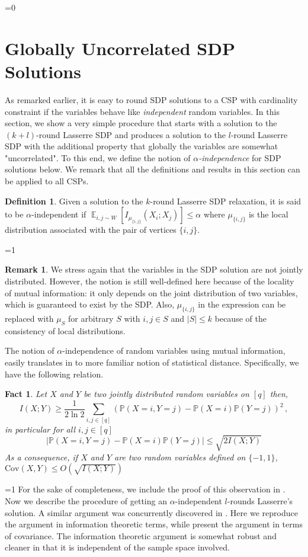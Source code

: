 \documentclass[11pt]{article}
\def\full{1}
\newtheorem{fact}[theorem]{Fact}
\theoremstyle{definition}
\newtheorem{definition}[theorem]{Definition}
\newtheorem{remark}[theorem]{Remark}
\newcommand{\Esymb}{\mathbb{E}}
\DeclareMathOperator*{\E}{\Esymb}
\newcommand{\mcom}{\,,}
\renewcommand{\leq}{\leqslant}
\renewcommand{\geq}{\geqslant}
\numberwithin{equation}{section}
\let\pref=\prettyref
\begin{document}
\ifnum\full=0 \vspace{-8pt}\fi
\section{Globally Uncorrelated SDP Solutions} \label{sec:uncorrelatedsol}

As remarked earlier, it is easy to round SDP solutions to a CSP with
cardinality constraint if the variables behave like {\it independent} random
variables.  In this section, we show a very simple procedure that
starts with a solution to the $(k+l)$-round Lasserre SDP and produces
a solution to the $l$-round Lasserre SDP with the additional property
that globally the variables are somewhat "uncorrelated".  To this end, we define the
notion of {\it $\alpha$-independence} for SDP solutions below.
We remark that all the definitions and results in this section can be applied to all CSPs.


\begin{definition} \label{def:alphaindependentsol}
Given a solution to the $k$-round Lasserre SDP relaxation, it is said
to be $\alpha$-independent if
$
\E_{i,j\sim W}[I_{\mu_{\{i,j\}}}(X_i;X_j)]\leq \alpha
$
where $\mu_{\{i,j\}}$ is the local distribution associated with the
pair of vertices $\{i,j\}$.
\end{definition}
\ifnum\full=1
\begin{remark}
We stress again that the variables in the SDP solution are not jointly distributed. However, the notion is still well-defined here because of the locality of mutual information: it only depends on the joint distribution of two variables, which is guaranteed to exist by the SDP. Also, $\mu_{\{i,j\}}$ in the expression can be replaced with $\mu_{S}$ for arbitrary $S$ with $i,j\in S$ and $|S|\leq k$ because of the consistency of local distributions.
\end{remark}
\fi

The notion of $\alpha$-independence of random variables using mutual
information, easily translates in to more familiar notion of
statistical distance.  Specifically, we have the following relation.
\begin{fact} \label{fact:statdist}
Let $X$ and $Y$ be two jointly distributed random variables on $[q]$
then,
$$ I(X;Y)\geq \frac{1}{2\ln2}\sum_{i,j\in
[q]}(\mathbb{P}(X=i,Y=j)-\mathbb{P}(X=i)\mathbb{P}(Y=j))^2 \mcom $$
in particular for all $i,j\in [q]$
$$
|\mathbb{P}(X=i,Y=j)-\mathbb{P}(X=i)\mathbb{P}(Y=j)|\leq \sqrt{2 I(X;Y)}
$$
As a consequence, if $X$ and $Y$ are two random variables defined on $\{-1,1\}$,
$
\mbox{Cov}(X,Y)\leq O(\sqrt{I(X;Y)})
$
\end{fact}
\ifnum\full=1
For the sake of completeness, we include the proof of this observation
in \pref{app:informationtheory}.
\fi
Now we describe the procedure of getting an $\alpha$-independent
$l$-rounds Lasserre's solution.  A similar argument was concurrently discovered in \cite{BarakRS11}.
Here we reproduce the argument in information theoretic terms, while
\cite{BarakRS11} present the argument in terms of covariance.  The
information theoretic argument is somewhat robust and cleaner in that it is
independent of the sample space involved.
\end{document}
